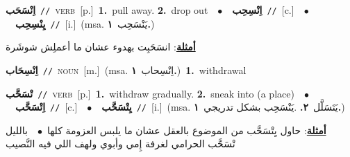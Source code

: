 \documentclass[10pt,a4paper,twoside]{article} %
\begin{document}
\begin{multicols}{2}
{\setlength\topsep{0pt}\textbf{\foreignlanguage{arabic}{اِنْسَحَب}}\ {\color{gray}\texttt{//}\color{black}}\ \textsc{verb}\ [p.]\ \textbf{1.}~pull away.  \textbf{2.}~drop out\ \ $\bullet$\ \ \setlength\topsep{0pt}\textbf{\foreignlanguage{arabic}{اِنْسِحِب}}\ {\color{gray}\texttt{//}\color{black}}\ [c.]\ \ $\bullet$\ \ \setlength\topsep{0pt}\textbf{\foreignlanguage{arabic}{يِنْسِحِب}}\ {\color{gray}\texttt{//}\color{black}}\ [i.]\ \color{gray}(msa. \foreignlanguage{arabic}{يَنْسَحِب}~\foreignlanguage{arabic}{\textbf{١.}})\color{black}\  \begin{flushright}\color{gray}\foreignlanguage{arabic}{\textbf{\underline{\foreignlanguage{arabic}{أمثلة}}}: انسَحَبِت بهدوء عشان ما أعملِش شوشَرة}\end{flushright}\color{black}} \vspace{2mm}

{\setlength\topsep{0pt}\textbf{\foreignlanguage{arabic}{اِنْسِحَاب}}\ {\color{gray}\texttt{//}\color{black}}\ \textsc{noun}\ [m.]\ \color{gray}(msa. \foreignlanguage{arabic}{اِنْسِحاب}~\foreignlanguage{arabic}{\textbf{١.}})\color{black}\ \textbf{1.}~withdrawal\ } \vspace{2mm}

{\setlength\topsep{0pt}\textbf{\foreignlanguage{arabic}{تْسَحَّب}}\ {\color{gray}\texttt{//}\color{black}}\ \textsc{verb}\ [p.]\ \textbf{1.}~withdraw gradually.  \textbf{2.}~sneak into (a place)\ \ $\bullet$\ \ \setlength\topsep{0pt}\textbf{\foreignlanguage{arabic}{اِتْسَحَّب}}\ {\color{gray}\texttt{//}\color{black}}\ [c.]\ \ $\bullet$\ \ \setlength\topsep{0pt}\textbf{\foreignlanguage{arabic}{يِتْسَحَّب}}\ {\color{gray}\texttt{//}\color{black}}\ [i.]\ \color{gray}(msa. \foreignlanguage{arabic}{يَتَسَلَّل}~\foreignlanguage{arabic}{\textbf{٢.}}  .\foreignlanguage{arabic}{يَنْسَحِب بشكل تدريجي}~\foreignlanguage{arabic}{\textbf{١.}})\color{black}\  \begin{flushright}\color{gray}\foreignlanguage{arabic}{\textbf{\underline{\foreignlanguage{arabic}{أمثلة}}}: حاول يِتْسَحَّب من الموضوع بالعقل عشان ما يلبس العزومة كلها\ $\bullet$\ \  بالليل تْسَحَّب الحرامي لغرفة إِمي وأبوي ولهف اللي فيه النَّصيب}\end{flushright}\color{black}} \vspace{2mm}


\end{multicols}
\end{document}
